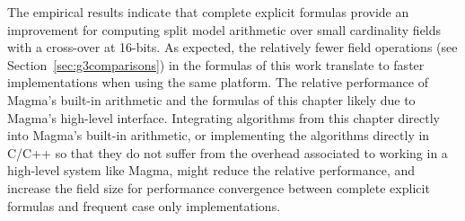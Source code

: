 The empirical results indicate that complete explicit formulas provide an
improvement for computing split model arithmetic over small
cardinality fields with a cross-over at 16-bits.  As expected, the relatively
fewer field operations (see Section~\ref{sec:g3comparisons}) in the formulas of
this work translate to faster implementations when using the same platform. The
relative performance of Magma's built-in arithmetic and the formulas of this
chapter likely due to Magma's high-level interface. Integrating algorithms from
this chapter directly into Magma's built-in arithmetic, or implementing the
algorithms directly in C/C++ so that they do not suffer from the overhead
associated to working in a high-level system like Magma, might reduce the
relative performance, and increase the field size for performance convergence
between complete explicit formulas and frequent case only implementations.